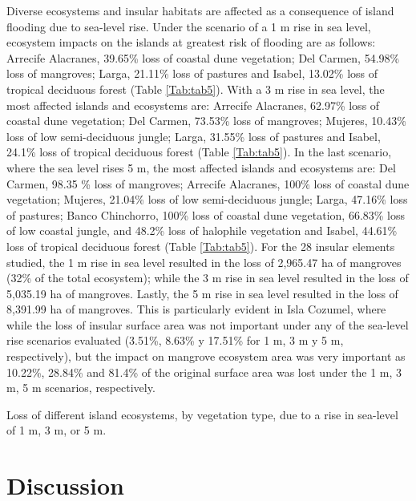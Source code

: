 \documentclass{article} %
\begin{document}
Diverse ecosystems and insular habitats are affected as a consequence of island
flooding due to sea-level rise. Under the scenario of a 1 m rise in sea level, ecosystem
impacts on the islands at greatest risk of flooding are as follows: Arrecife Alacranes,
39.65\% loss of coastal dune vegetation; Del Carmen, 54.98\% loss of mangroves;
Larga, 21.11\% loss of pastures and Isabel, 13.02\% loss of tropical deciduous forest
(Table \ref{Tab:tab5}). With a 3 m rise in sea level, the most affected islands and ecosystems are:
Arrecife Alacranes, 62.97\% loss of coastal dune vegetation; Del Carmen, 73.53\%
loss of mangroves; Mujeres, 10.43\% loss of low semi-deciduous jungle; Larga,
31.55\% loss of pastures and Isabel, 24.1\% loss of tropical deciduous forest (Table \ref{Tab:tab5}). In the last scenario, where the sea level rises 5 m, the most affected islands and
ecosystems are: Del Carmen, 98.35 \% loss of mangroves; Arrecife Alacranes, 100\%
loss of coastal dune vegetation; Mujeres, 21.04\% loss of low semi-deciduous jungle;
Larga, 47.16\% loss of pastures; Banco Chinchorro, 100\% loss of coastal dune
vegetation, 66.83\% loss of low coastal jungle, and 48.2\% loss of halophile vegetation
and Isabel, 44.61\% loss of tropical deciduous forest (Table \ref{Tab:tab5}). For the 28 insular
elements studied, the 1 m rise in sea level resulted in the loss of 2,965.47 ha of
mangroves (32\% of the total ecosystem); while the 3 m rise in sea level resulted in
the loss of 5,035.19 ha of mangroves. Lastly, the 5 m rise in sea level resulted in the
loss of 8,391.99 ha of mangroves. This is particularly evident in Isla Cozumel, where
while the loss of insular surface area was not important under any of the sea-level
rise scenarios evaluated (3.51\%, 8.63\% y 17.51\% for 1 m, 3 m y 5 m, respectively),
but the impact on mangrove ecosystem area was very important as 10.22\%, 28.84\%
and 81.4\% of the original surface area was lost under the 1 m, 3 m, 5 m scenarios,
respectively.

\begin{table}
\centering
\caption{Loss of different island ecosystems, by vegetation type, due to a rise in
sea-level of 1 m, 3 m, or 5 m.}
\label{Tab:tab5}
\end{table}



\section{Discussion}
\end{document}
